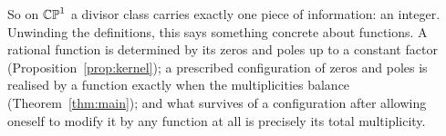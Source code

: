 So on $\mathbb{CP}^1$ a divisor class carries exactly one piece of information: an integer.
Unwinding the definitions, this says something concrete about functions. A
rational function is determined by its zeros and poles up to a constant factor
(Proposition~\ref{prop:kernel}); a prescribed configuration of zeros and poles is
realised by a function exactly when the multiplicities balance
(Theorem~\ref{thm:main}); and what survives of a configuration after allowing
oneself to modify it by any function at all is precisely its total multiplicity.

